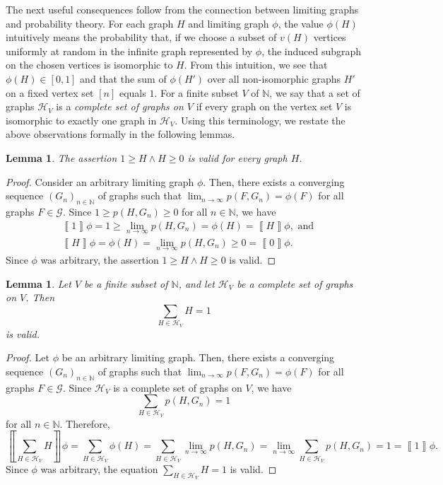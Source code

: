 \documentclass{article}
\newtheorem{lem}[thm]{Lemma}
\newcommand*{\db}[1]{\left\llbracket #1 \right\rrbracket}
\begin{document}
The next useful consequences follow from the connection between  limiting graphs and probability theory. For each graph $H$ and limiting graph $\phi$, the value $\phi(H)$ intuitively means the probability that, if we choose a subset of $v(H)$ vertices uniformly at random in the infinite graph represented by $\phi$, the induced subgraph on the chosen vertices is isomorphic to $H$. From this intuition, we see that $\phi(H) \in [0,1]$ and that the sum of $\phi(H')$ over all non-isomorphic graphs $H'$ on a fixed vertex set $[n]$ equals $1$. For a finite subset $V$ of $\mathbb{N}$, we say that a set of graphs $\mathcal{H}_V$ is a \emph{complete set of graphs on $V$} if every graph on the vertex set $V$ is isomorphic to exactly one graph in $\mathcal{H}_V$. Using this terminology, 
we restate the above observations formally in the following lemmas.
\begin{lem}
  \label{lemma:non-negativity}
  The assertion $1 \geq H \wedge H \geq 0$ is valid for every graph $H$.
\end{lem}
\begin{proof}
  Consider an arbitrary limiting graph $\phi$. Then, there exists 
  a converging sequence $(G_n)_{n \in \mathbb{N}}$ of graphs such that 
  $\lim_{n \to \infty} p(F,G_n) = \phi(F)$ for all graphs $F \in \mathcal{G}$. Since $1 \geq p(H,G_n) \geq 0$ for all $n \in \mathbb{N}$, we have
  \begin{align*}
  & \db{1}\phi = 1 \geq \lim_{n \to \infty} p(H,G_n) = \phi(H) = \db{H}\phi, \text{ and}
  \\
  & \db{H}\phi = \phi(H) = \lim_{n \to \infty} p(H,G_n) \geq 0 = \db{0}\phi.
  \end{align*}
  Since $\phi$ was arbitrary, the assertion $1 \geq H \wedge H \geq 0$ is valid.
\end{proof}
\begin{lem}
  \label{lemma:sum-to-one}
  Let $V$ be a finite subset of $\mathbb{N}$, and let $\mathcal{H}_V$ be a complete set of graphs on $V$. Then
  \[
  \sum_{H \in \mathcal{H}_V} H = 1
  \]
  is valid.
\end{lem}
\begin{proof}
  Let $\phi$ be an arbitrary limiting graph. Then, there exists 
  a converging sequence $(G_n)_{n \in \mathbb{N}}$ of graphs such that 
  $\lim_{n \to \infty} p(F,G_n) = \phi(F)$ for all graphs $F \in \mathcal{G}$. Since $\mathcal{H}_V$ is a complete set of graphs on $V$, we have
  \[
  \sum_{H \in \mathcal{H}_V} p(H,G_n) = 1
  \]
  for all $n \in \mathbb{N}$. Therefore,
  \[
  \db{\sum_{H \in \mathcal{H}_V} H}\phi =
  \sum_{H \in \mathcal{H}_V} \phi(H) = \sum_{H \in \mathcal{H}_V} \lim_{n \to \infty} p(H,G_n) = \lim_{n \to \infty} \sum_{H \in \mathcal{H}_V} p(H,G_n) = 1 = \db{1}\phi.
  \]
  Since $\phi$ was arbitrary, the equation $\sum_{H \in \mathcal{H}_V} H = 1$ is valid.
\end{proof}
\end{document}
